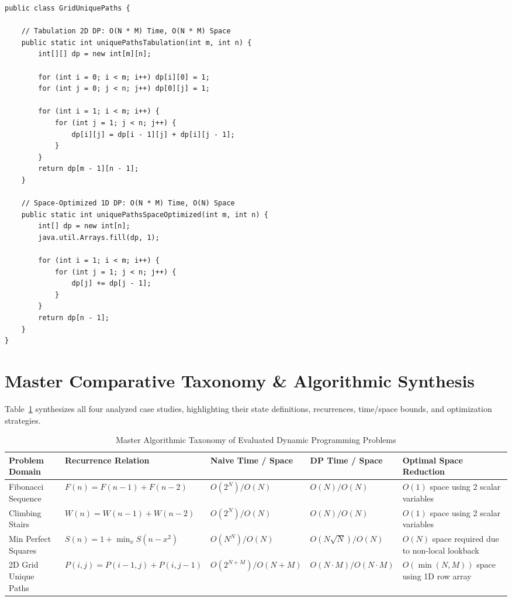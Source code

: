 \documentclass[10pt,journal,compsoc,onecolumn]{IEEEtran}
\begin{document}
\begin{verbatim}
public class GridUniquePaths {

    // Tabulation 2D DP: O(N * M) Time, O(N * M) Space
    public static int uniquePathsTabulation(int m, int n) {
        int[][] dp = new int[m][n];

        for (int i = 0; i < m; i++) dp[i][0] = 1;
        for (int j = 0; j < n; j++) dp[0][j] = 1;

        for (int i = 1; i < m; i++) {
            for (int j = 1; j < n; j++) {
                dp[i][j] = dp[i - 1][j] + dp[i][j - 1];
            }
        }
        return dp[m - 1][n - 1];
    }

    // Space-Optimized 1D DP: O(N * M) Time, O(N) Space
    public static int uniquePathsSpaceOptimized(int m, int n) {
        int[] dp = new int[n];
        java.util.Arrays.fill(dp, 1);

        for (int i = 1; i < m; i++) {
            for (int j = 1; j < n; j++) {
                dp[j] += dp[j - 1];
            }
        }
        return dp[n - 1];
    }
}
\end{verbatim}


\section{Master Comparative Taxonomy \& Algorithmic Synthesis}
\label{sec:taxonomy}

Table~\ref{tab:dp-summary} synthesizes all four analyzed case studies, highlighting their state definitions, recurrences, time/space bounds, and optimization strategies.

\begin{table}[htbp]
\centering
\caption{Master Algorithmic Taxonomy of Evaluated Dynamic Programming Problems}
\label{tab:dp-summary}
\begin{tabular}{p{2.8cm}p{3.4cm}p{2.6cm}p{2.2cm}p{2.8cm}}
\toprule
\textbf{Problem Domain} & \textbf{Recurrence Relation} & \textbf{Naive Time / Space} & \textbf{DP Time / Space} & \textbf{Optimal Space Reduction} \\
\midrule
Fibonacci Sequence & $F(n) = F(n-1) + F(n-2)$ & $O(2^N) / O(N)$ & $O(N) / O(N)$ & $O(1)$ space using 2 scalar variables \\
Climbing Stairs & $W(n) = W(n-1) + W(n-2)$ & $O(2^N) / O(N)$ & $O(N) / O(N)$ & $O(1)$ space using 2 scalar variables \\
Min Perfect Squares & $S(n) = 1 + \min_{x} S(n - x^2)$ & $O(N^N) / O(N)$ & $O(N \sqrt{N}) / O(N)$ & $O(N)$ space required due to non-local lookback \\
2D Grid Unique Paths & $P(i,j) = P(i-1,j) + P(i,j-1)$ & $O(2^{N+M}) / O(N+M)$ & $O(N \cdot M) / O(N \cdot M)$ & $O(\min(N,M))$ space using 1D row array \\
\bottomrule
\end{tabular}
\end{table}
\end{document}
